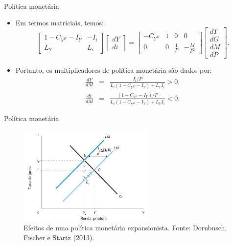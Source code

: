 \documentclass[10pt]{beamer}
\begin{document}
\begin{frame}{Política monetária}
\begin{itemize}
    \item Em termos matriciais, temos:
    \begin{equation}
        \begin{bmatrix}
            1-C_{Y^D}-I_Y & -I_i \\ L_Y & L_i
        \end{bmatrix}\begin{bmatrix}
            dY\\di
        \end{bmatrix} = \begin{bmatrix}
            -C_{Y^D} & 1 & 0 & 0 \\
            0 & 0 & \frac{1}{P} & -\frac{M}{P^2}
        \end{bmatrix}\begin{bmatrix}
            dT \\ dG \\ dM \\ dP
        \end{bmatrix}. \label{eq1} 
    \end{equation}
    \bigskip
    \item Portanto, os multiplicadores de política monetária são dados por:
    \begin{eqnarray}
    \frac{dY}{dM} &=& \frac{I_i/P}{L_i(1-C_{Y^D}-I_Y) + L_YI_i} > 0, \label{eq2} \\
    \frac{di}{dM} &=& \frac{(1-C_{Y^D}-I_Y)/P}{L_i(1-C_{Y^D}-I_Y) + L_YI_i} < 0. \label{eq3}
    \end{eqnarray}
\end{itemize}
\end{frame}

\begin{frame}{Política monetária}
\begin{figure}
    \centering
    \includegraphics[width=0.6\textwidth]{./figures/aula102_fig1.JPG}
    \caption{Efeitos de uma política monetária expansionista. Fonte: Dornbusch, Fischer e Startz (2013).}
    \label{fig1}
\end{figure}
\end{frame}
\end{document}

